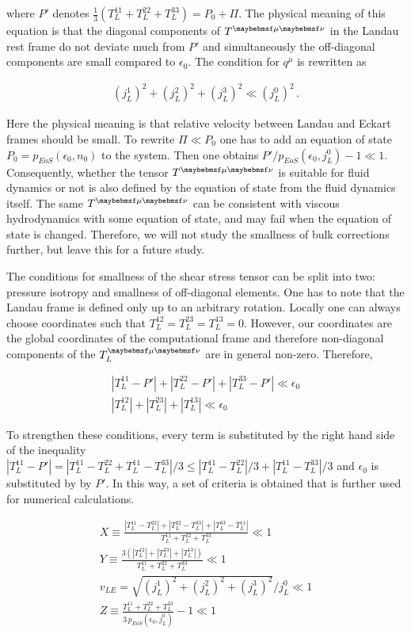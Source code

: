 where $P'$ denotes $\frac{1}{3} (T_L^{11} + T_L^{22} + T_L^{33}) = P_0 + \Pi$.
The physical meaning of this equation is that the diagonal components of $\Tmn$
in the Landau rest frame do not deviate much from $P'$ and simultaneously the
off-diagonal components are small compared to $\epsilon_0$. The condition for
$q^{\mu}$ is rewritten as

\begin{align}
(j_L^1)^2 + (j_L^2)^2 + (j_L^3)^2 \ll (j_L^0)^2 \,.
\end{align}

Here the physical meaning is that relative velocity between Landau and Eckart
frames should be small.  To rewrite $\Pi \ll P_0$ one has to add an equation of
state $P_0 = p_{EoS}(\epsilon_0, n_0)$ to the system. Then one obtains
$P'/p_{EoS}(\epsilon_0, j^0_L) - 1\ll 1$. Consequently, whether the tensor
$\Tmn$ is suitable for fluid dynamics or not is also defined by the equation of
state from the fluid dynamics itself. The same $\Tmn$ can be consistent with
viscous hydrodynamics with some equation of state, and may fail when the
equation of state is changed. Therefore, we will not study the smallness of bulk
corrections further, but leave this for a future study.

The conditions for smallness of the shear stress tensor can be split into two:
pressure isotropy and smallness of off-diagonal elements. One has to note that
the Landau frame is defined only up to an arbitrary rotation. Locally one can
always choose coordinates such that $T^{12}_L = T^{23}_L = T^{13}_L = 0$.
However, our coordinates are the global coordinates of the computational frame
and therefore non-diagonal components of the $\Tmn_L$ are in general non-zero.
Therefore,

\begin{align}
  |T^{11}_L - P'| + |T^{22}_L - P'| + |T^{33}_L - P'| \ll \epsilon_0 \\
  |T^{12}_L| + |T^{23}_L| + |T^{13}_L| \ll \epsilon_0
\end{align}

To strengthen these conditions, every term is substituted by the right hand
side of the inequality $|T^{11}_L - P'| = |T^{11}_L - T^{22}_L + T^{11}_L -
T^{33}_L|/3 \le |T^{11}_L - T^{22}_L|/3 + |T^{11}_L - T^{33}_L|/3$ and
$\epsilon_0$ is substituted by by $P'$. In this way, a set of criteria is
obtained that is further used for numerical calculations.

\begin{align}
\label{cond_to_check}
  X \equiv \frac{|T^{11}_L - T^{22}_L| + |T^{22}_L - T^{33}_L| + |T^{33}_L - T^{11}_L|}{T^{11}_L + T^{22}_L + T^{33}_L} \ll 1 \\
  Y \equiv \frac{3(|T^{12}_L| + |T^{23}_L| + |T^{13}_L|)}{T^{11}_L + T^{22}_L + T^{33}_L} \ll 1 \nonumber \\
  v_{LE} = \sqrt{(j_L^1)^2 + (j_L^2)^2 + (j_L^3)^2}/j_L^0 \ll 1 \nonumber \\
  Z \equiv \frac{T^{11}_L + T^{22}_L + T^{33}_L}{3 \, p_{EoS}(\epsilon_0, j^0_L)} - 1 \ll 1 \nonumber
\end{align}

